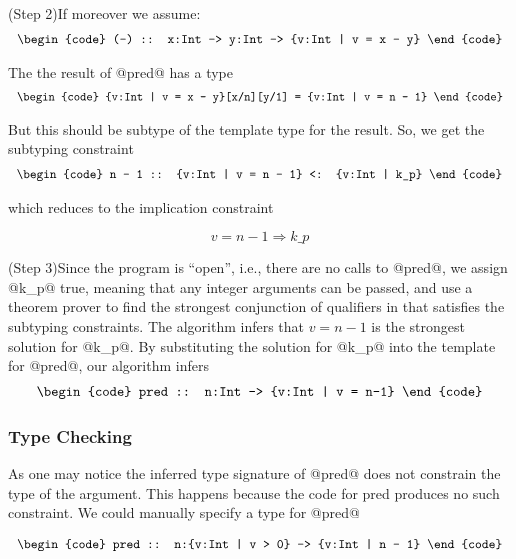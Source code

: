 (Step 2)If moreover we assume:
$$\centering
\begin{tabular}{c}
\begin{code}
(-) :: x:Int -> y:Int -> {v:Int | v = x - y}
\end{code}
\end{tabular}
$$

The the result of @pred@ has a type
$$\centering
\begin{tabular}{c}
\begin{code}
{v:Int | v = x - y}[x/n][y/1] = {v:Int | v = n - 1} 
\end{code}
\end{tabular}
$$

But this should be subtype of the template type for the result.
So, we get the subtyping constraint
$$\centering
\begin{tabular}{c}
\begin{code}
n - 1 :: {v:Int | v = n - 1} <: {v:Int | k_p}
\end{code}
\end{tabular}
$$

which reduces to the implication constraint 

$$
v = n - 1 \Rightarrow k\_p
$$

(Step 3)Since the program is ``open'', i.e., there are no calls to @pred@,
we assign @k_p@ true, meaning that any integer arguments can be
passed, and use a theorem prover to find the strongest conjunction
of qualifiers in \qset
that satisfies the subtyping constraints. 
The algorithm
infers that $v = n-1$ is the strongest solution for @k_p@.
By substituting the solution for @k_p@ into
the template for @pred@, our algorithm infers
$$\centering
\begin{tabular}{c}
\begin{code}
pred :: n:Int -> {v:Int | v = n-1}
\end{code}
\end{tabular}
$$


\subsubsection{Type Checking}
As one may notice the inferred type signature of @pred@ does not constrain the type of the argument.
This happens because the code for pred produces no such constraint.
We could manually specify a type for @pred@

$$\centering
\begin{tabular}{c}
\begin{code}
pred :: n:{v:Int | v > 0} -> {v:Int | n - 1}
\end{code}
\end{tabular}
$$

